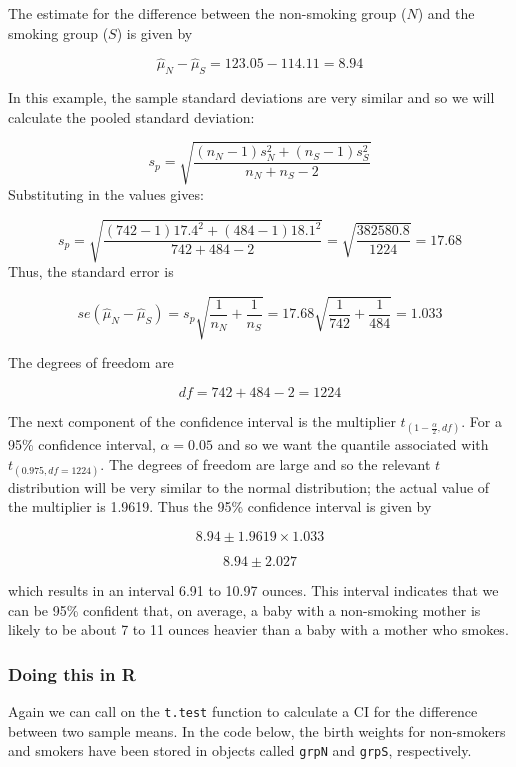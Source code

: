\documentclass[
  oneside]{krantz}
\newenvironment{Shaded}{\begin{snugshade}}{\end{snugshade}}
\newcommand{\AttributeTok}[1]{\textcolor[rgb]{0.77,0.63,0.00}{#1}}
\newcommand{\CommentTok}[1]{\textcolor[rgb]{0.56,0.35,0.01}{\textit{#1}}}
\newcommand{\ConstantTok}[1]{\textcolor[rgb]{0.00,0.00,0.00}{#1}}
\newcommand{\FunctionTok}[1]{\textcolor[rgb]{0.00,0.00,0.00}{#1}}
\newcommand{\NormalTok}[1]{#1}
\newcommand{\SpecialCharTok}[1]{\textcolor[rgb]{0.00,0.00,0.00}{#1}}
\begin{document}
The estimate for the difference between the non-smoking group (\(N\)) and the smoking group (\(S\)) is given by

\[\hat \mu_N - \hat \mu_S = 123.05 - 114.11  = 8.94\]

In this example, the sample standard deviations are very similar and so we will calculate the pooled standard deviation:

\[ s_p = \sqrt{\frac{(n_N-1)s_N^2 + (n_S-1)s_S^2}{n_N + n_S -2}}\]
Substituting in the values gives:

\[ s_p = \sqrt{\frac{(742-1)17.4^2 + (484-1)18.1^2}{742 + 484 -2}}  = \sqrt{\frac{382580.8}{1224}} = 17.68\]
Thus, the standard error is

\[se(\hat{\mu}_N - \hat{\mu}_S)=s_p\sqrt{\frac{1}{n_N} + \frac{1}{n_S}} = 17.68 \sqrt{\frac{1}{742} + \frac{1}{484}} = 1.033\]

The degrees of freedom are

\[df = 742 + 484 - 2 = 1224\]

The next component of the confidence interval is the multiplier \(t_{(1-\frac{\alpha}{2}, df)}\). For a 95\% confidence interval, \(\alpha=0.05\) and so we want the quantile associated with \(t_{(0.975,df=1224)}\). The degrees of freedom are large and so the relevant \(t\) distribution will be very similar to the normal distribution; the actual value of the multiplier is 1.9619. Thus the 95\% confidence interval is given by

\[8.94 \pm 1.9619 \times 1.033 \]

\[8.94 \pm 2.027\]

which results in an interval 6.91 to 10.97 ounces. This interval indicates that we can be 95\% confident that, on average, a baby with a non-smoking mother is likely to be about 7 to 11 ounces heavier than a baby with a mother who smokes.

\hypertarget{doing-this-in-r-8}{%
\subsubsection{Doing this in R}\label{doing-this-in-r-8}}

Again we can call on the \texttt{t.test} function to calculate a CI for the difference between two sample means. In the code below, the birth weights for non-smokers and smokers have been stored in objects called \texttt{grpN} and \texttt{grpS}, respectively.

\begin{Shaded}
\end{Shaded}
\end{document}
